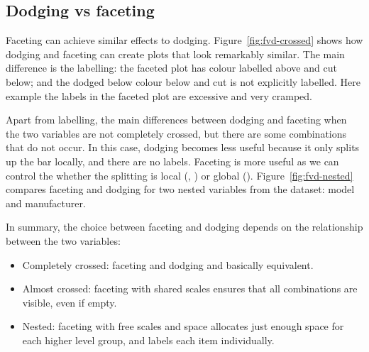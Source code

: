\subsection{Dodging vs faceting}
\label{sub:dodge-vs-facet}

Faceting can achieve similar effects to dodging.  Figure~\ref{fig:fvd-crossed} shows how dodging and faceting can create plots that look remarkably similar.  The main difference is the labelling: the faceted plot has colour labelled above and cut below; and the dodged below colour below and cut is not explicitly labelled.  Here example the labels in the faceted plot are excessive and very cramped.  

% 


Apart from labelling, the main differences between dodging and faceting when the two variables are not completely crossed, but there are some combinations that do not occur.  In this case, dodging becomes less useful because it only splits up the bar locally, and there are no labels.  Faceting is more useful as we can control the whether the splitting is local (, ) or global ().  Figure~\ref{fig:fvd-nested} compares faceting and dodging for two nested variables from the  dataset: model and manufacturer.

In summary, the choice between faceting and dodging depends on the relationship between the two variables:

\begin{itemize}
  \item Completely crossed: faceting and dodging and basically equivalent.

  \item Almost crossed: faceting with shared scales ensures that all combinations are visible, even if empty.

  \item Nested: faceting with free scales and space allocates just enough space for each higher level group, and labels each item individually.
\end{itemize}

